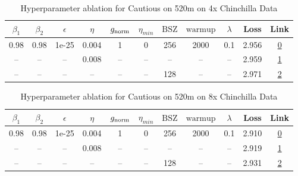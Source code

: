 \begin{table}[H]
\centering
\caption{Hyperparameter ablation for Cautious on 520m on 4x Chinchilla Data}
\label{tab:ablation_cautious_520m_on_4x_chinchilla_data}
\begin{tabular}{ccccccccccc}
\toprule
$\beta_1$ & $\beta_2$ & $\epsilon$ & $\eta$ & $g_{\mathrm{norm}}$ & $\eta_{min}$ & $\mathrm{BSZ}$ & $\mathrm{warmup}$ & $\lambda$ & Loss & Link \\
\midrule
0.98 & 0.98 & 1e-25 & 0.004 & 1 & 0 & 256 & 2000 & 0.1 & 2.956 & \href{https://wandb.ai/marin-community/optimizer-scaling/runs/sweep-520m-42B-cautious553798lr0.004-wd0.1-minlr0-warmup2000-b10-e08bbe}{0} \\
\midrule
-- & -- & -- & 0.008 & -- & -- & -- & -- & -- & 2.959 & \href{https://wandb.ai/marin-community/optimizer-scaling/runs/sweep-520m-42B-cautiousd91085lr0.008-wd0.1-minlr0-warmup2000-b10-50463b}{1} \\
-- & -- & -- & -- & -- & -- & 128 & -- & -- & 2.971 & \href{https://wandb.ai/marin-community/optimizer-scaling/runs/sweep-520m-42B-cautious6977a2lr0.004-wd0.1-minlr0-warmup2000-b10-27d459}{2} \\
\bottomrule
\end{tabular}
\end{table}

\begin{table}[H]
\centering
\caption{Hyperparameter ablation for Cautious on 520m on 8x Chinchilla Data}
\label{tab:ablation_cautious_520m_on_8x_chinchilla_data}
\begin{tabular}{ccccccccccc}
\toprule
$\beta_1$ & $\beta_2$ & $\epsilon$ & $\eta$ & $g_{\mathrm{norm}}$ & $\eta_{min}$ & $\mathrm{BSZ}$ & $\mathrm{warmup}$ & $\lambda$ & Loss & Link \\
\midrule
0.98 & 0.98 & 1e-25 & 0.004 & 1 & 0 & 256 & 2000 & 0.1 & 2.910 & \href{https://wandb.ai/marin-community/optimizer-scaling/runs/sweep-520m-85B-cautious66b1b7lr0.004-wd0.1-minlr0-warmup2000-b10-d99a40}{0} \\
\midrule
-- & -- & -- & 0.008 & -- & -- & -- & -- & -- & 2.919 & \href{https://wandb.ai/marin-community/optimizer-scaling/runs/sweep-520m-85B-cautious33285clr0.008-wd0.1-minlr0-warmup2000-b10-260c3f}{1} \\
-- & -- & -- & -- & -- & -- & 128 & -- & -- & 2.931 & \href{https://wandb.ai/marin-community/optimizer-scaling/runs/sweep-520m-85B-cautious8ee009lr0.004-wd0.1-minlr0-warmup2000-b10-2ee0a2}{2} \\
\bottomrule
\end{tabular}
\end{table}

